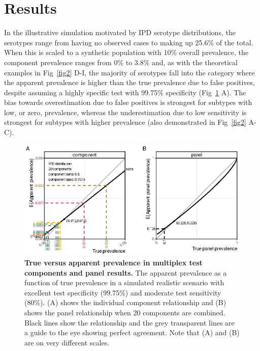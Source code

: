 \documentclass[10pt,letterpaper]{article}
\begin{document}
\section*{Results}

In the illustrative simulation motivated by IPD serotype distributions, the serotypes range from having no observed cases to making up 25.6\% of the total\cite{hyams2023}. When this is scaled to a synthetic population with 10\% overall prevalence, the component prevalence ranges from 0\% to 3.8\% and, as with the theoretical examples in Fig~\ref{fig2} D-I, the majority of serotypes fall into the category where the apparent prevalence is higher than the true prevalence due to false positives, despite assuming a highly specific test with 99.75\% specificity (Fig~\ref{fig3} A). The bias towards overestimation due to false positives is strongest for subtypes with low, or zero, prevalence, whereas the underestimation due to low sensitivity is strongest for subtypes with higher prevalence (also demonstrated in Fig~\ref{fig2} A-C).

\begin{figure}[ht!]
\centerline{\includegraphics{fig/fig3-true-apparent-prevalence-component-panels.eps}}
\caption{{\bf True versus apparent prevalence in multiplex test components and panel results.}
The apparent prevalence as a function of true prevalence in a simulated realistic scenario with excellent test specificity (99.75\%) and moderate test sensitivity (80\%). (A) shows the individual component relationship and (B) shows the panel relationship when 20 components are combined. Black lines show the relationship and the grey transparent lines are a guide to the eye showing perfect agreement. Note that (A) and (B) are on very different scales.
}
\label{fig3}
\end{figure}
\end{document}
